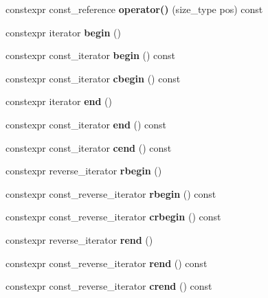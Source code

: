 \begin{DoxyCompactItemize}
\mbox{\label{classnumpp_1_1vector_adccd806cababde7552083fd4e6dc1120}} 
constexpr const\+\_\+reference {\bfseries operator()} (size\+\_\+type pos) const
\item 
\mbox{\label{classnumpp_1_1vector_a4a6a323fba82f8d7e00a97e5c680f3ac}} 
constexpr iterator {\bfseries begin} ()
\item 
\mbox{\label{classnumpp_1_1vector_abf65526b58940a75270e79e8acb7f9de}} 
constexpr const\+\_\+iterator {\bfseries begin} () const
\item 
\mbox{\label{classnumpp_1_1vector_a7a50f2bcccc47bc2cbbc3a14dd4d85cd}} 
constexpr const\+\_\+iterator {\bfseries cbegin} () const
\item 
\mbox{\label{classnumpp_1_1vector_a554526a327c85c0abc597dff4917b220}} 
constexpr iterator {\bfseries end} ()
\item 
\mbox{\label{classnumpp_1_1vector_a82561fe6ed71bea8de02702a18d3d790}} 
constexpr const\+\_\+iterator {\bfseries end} () const
\item 
\mbox{\label{classnumpp_1_1vector_ac8aecec72fe89e6b818753a2c44ca696}} 
constexpr const\+\_\+iterator {\bfseries cend} () const
\item 
\mbox{\label{classnumpp_1_1vector_a4f7d7c70486774b877e59c072562a257}} 
constexpr reverse\+\_\+iterator {\bfseries rbegin} ()
\item 
\mbox{\label{classnumpp_1_1vector_aaf68aef32052dbc490633fc584443e16}} 
constexpr const\+\_\+reverse\+\_\+iterator {\bfseries rbegin} () const
\item 
\mbox{\label{classnumpp_1_1vector_addd32fda791bcf70bfd1b59669b56858}} 
constexpr const\+\_\+reverse\+\_\+iterator {\bfseries crbegin} () const
\item 
\mbox{\label{classnumpp_1_1vector_ad25f7bea977b38be2df1a333063e4dac}} 
constexpr reverse\+\_\+iterator {\bfseries rend} ()
\item 
\mbox{\label{classnumpp_1_1vector_aa077f06cd578ae87860a55b3d1803608}} 
constexpr const\+\_\+reverse\+\_\+iterator {\bfseries rend} () const
\item 
\mbox{\label{classnumpp_1_1vector_a953588920df3adbb93c0056f98a6d5cc}} 
constexpr const\+\_\+reverse\+\_\+iterator {\bfseries crend} () const
\end{DoxyCompactItemize}
